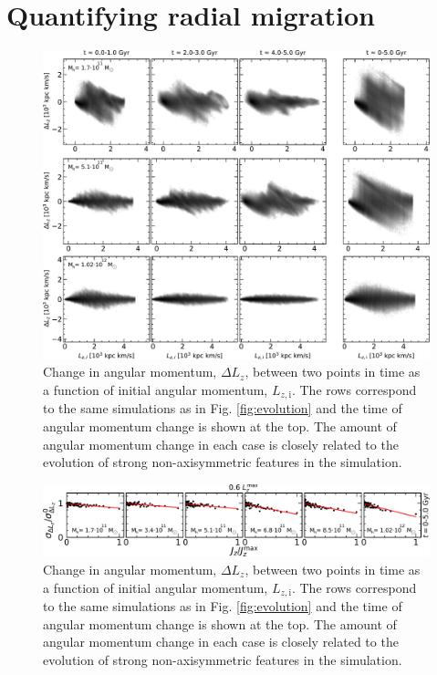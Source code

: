 \section{Quantifying radial migration}\label{sec:p1-quantifying}
\begin{figure}[t]
    \centering
    \includegraphics[width=1\textwidth]{images/dlz.pdf}
    \caption{Change in angular momentum, $\Delta L_z$, between two points in time as a function of initial angular momentum, $L_{z, \mathrm{i}}$. The rows correspond to the same simulations as in Fig. \ref{fig:evolution} and the time of angular momentum change is shown at the top. The amount of angular momentum change in each case is closely related to the evolution of strong non-axisymmetric features in the simulation.} %
    \label{fig:dlz}
\end{figure}
\begin{figure}[t]
    \centering
    \includegraphics[width=1\textwidth]{images/slopes.pdf}
    \caption{Change in angular momentum, $\Delta L_z$, between two points in time as a function of initial angular momentum, $L_{z, \mathrm{i}}$. The rows correspond to the same simulations as in Fig. \ref{fig:evolution} and the time of angular momentum change is shown at the top. The amount of angular momentum change in each case is closely related to the evolution of strong non-axisymmetric features in the simulation.} %
    \label{fig:slopes}
\end{figure}
